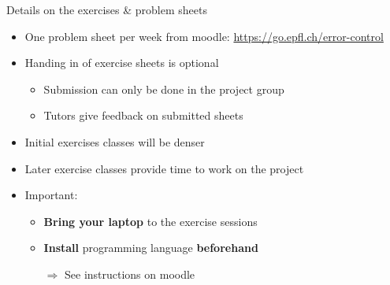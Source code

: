 \begin{frame}{Details on the exercises \& problem sheets}
    \begin{itemize}
        \item One problem sheet per week from moodle: \url{https://go.epfl.ch/error-control}
        \vspace{1em}
        \item Handing in of exercise sheets is optional
            \begin{itemize}
                \vspace{-0.3em}
                \item Submission can only be done in the project group
                \vspace{-0.3em}
                \item Tutors give feedback on submitted sheets
            \end{itemize}
        \vspace{1em}
        \item Initial exercises classes will be denser
        \item Later exercise classes provide time to work on the project
        \vspace{1em}
    \item \alert{Important:}
        \begin{itemize}
            \vspace{-0.3em}
            \item \textbf{Bring your laptop} to the exercise sessions
            \vspace{-0.3em}
            \item \textbf{Install \julia} programming language \textbf{beforehand}
            \vspace{-0.3em}
            \item[$\Rightarrow$] See \alert{instructions on moodle}
        \end{itemize}
    \end{itemize}
\end{frame}

